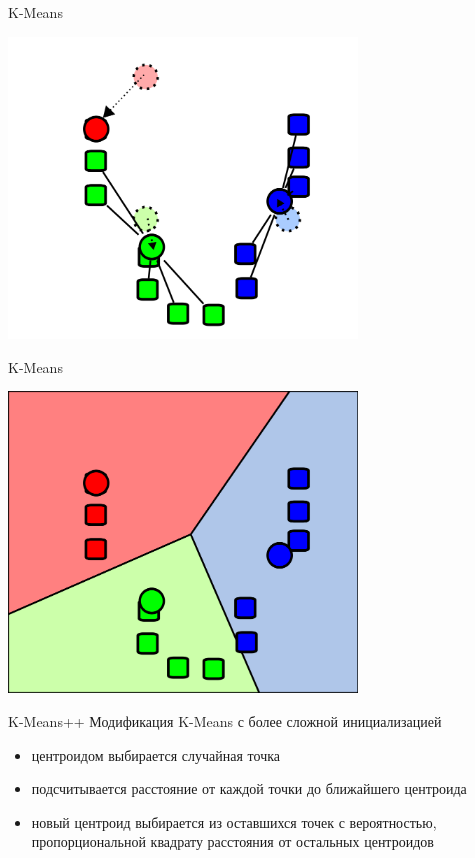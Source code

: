 \documentclass[10pt]{beamer}
\begin{document}
\begin{frame}{K-Means}
  \begin{center}
    \includegraphics[height=8cm]{clustering3.png}
  \end{center}
\end{frame}

\begin{frame}{K-Means}
  \begin{center}
    \includegraphics[height=8cm]{clustering4.png}
  \end{center}
\end{frame}

\begin{frame}{K-Means++}
  Модификация K-Means с более сложной инициализацией
  \begin{itemize}
  \item центроидом выбирается случайная точка
  \item подсчитывается расстояние от каждой точки до ближайшего центроида
  \item новый центроид выбирается из оставшихся точек с вероятностью, пропорциональной квадрату расстояния от остальных центроидов
  \end{itemize}
\end{frame}
\end{document}

